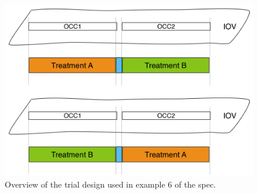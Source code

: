 \documentclass[a4paper,10pt]{article}
\begin{document}
\begin{figure}[htb]
\includegraphics[width=\linewidth]{../pics/iov1simulation_grafio}
\caption{Overview of the trial design used in example 6 of the spec.}
\label{fig:eg6-trial-design}
\end{figure}
\end{document}
